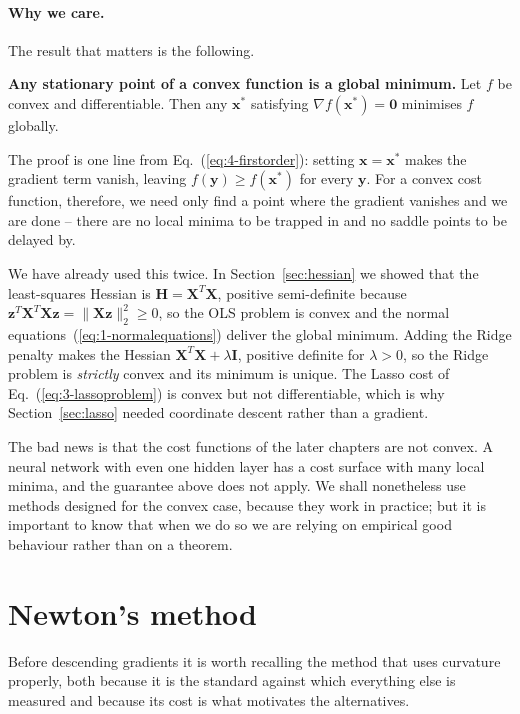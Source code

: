 \paragraph{Why we care.}
The result that matters is the following.

\begin{notebox}
\textbf{Any stationary point of a convex function is a global minimum.}
Let $f$ be convex and differentiable.  Then any $\bm{x}^{*}$ satisfying
$\nabla f(\bm{x}^{*})=\bm{0}$ minimises $f$ globally.
\end{notebox}

The proof is one line from Eq.~(\ref{eq:4-firstorder}): setting
$\bm{x}=\bm{x}^{*}$ makes the gradient term vanish, leaving
$f(\bm{y})\ge f(\bm{x}^{*})$ for every $\bm{y}$.  For a convex cost function,
therefore, we need only find a point where the gradient vanishes and we are
done -- there are no local minima to be trapped in and no saddle points to be
delayed by.

We have already used this twice.  In Section~\ref{sec:hessian} we showed that
the least-squares Hessian is $\bm{H}=\bm{X}^{T}\bm{X}$, positive semi-definite
because $\bm{z}^{T}\bm{X}^{T}\bm{X}\bm{z}=\|\bm{X}\bm{z}\|_2^{2}\ge0$, so the
OLS problem is convex and the normal equations~(\ref{eq:1-normalequations})
deliver the global minimum.  Adding the Ridge penalty makes the Hessian
$\bm{X}^{T}\bm{X}+\lambda\bm{I}$, positive definite for $\lambda>0$, so the
Ridge problem is \emph{strictly} convex and its minimum is unique.  The Lasso
cost of Eq.~(\ref{eq:3-lassoproblem}) is convex but not differentiable, which
is why Section~\ref{sec:lasso} needed coordinate descent rather than a
gradient.

The bad news is that the cost functions of the later chapters are not convex.
A neural network with even one hidden layer has a cost surface with many local
minima, and the guarantee above does not apply.  We shall nonetheless use
methods designed for the convex case, because they work in practice; but it is
important to know that when we do so we are relying on empirical good
behaviour rather than on a theorem.

\section{Newton's method}
\label{sec:newton}

Before descending gradients it is worth recalling the method that uses
curvature properly, both because it is the standard against which everything
else is measured and because its cost is what motivates the alternatives.


